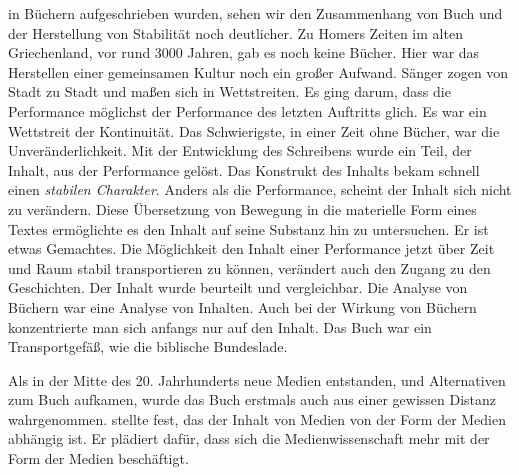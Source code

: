 in Büchern aufgeschrieben wurden, sehen wir den Zusammenhang von Buch und der
Herstellung von Stabilität noch deutlicher.   Zu Homers Zeiten im alten
Griechenland, vor rund 3000 Jahren, gab es noch keine Bücher. Hier war das
Herstellen einer gemeinsamen Kultur noch ein großer Aufwand. Sänger zogen von
Stadt zu Stadt und maßen sich in Wettstreiten. Es ging darum, dass die
Performance möglichst der Performance des letzten Auftritts glich. Es war ein
Wettstreit der Kontinuität. Das Schwierigste, in einer Zeit ohne Bücher, war die
Unveränderlichkeit. Mit der Entwicklung des Schreibens wurde ein Teil, der
Inhalt, aus der Performance gelöst. Das Konstrukt des Inhalts bekam schnell
einen \emph{stabilen Charakter}. Anders als die Performance, scheint der Inhalt
sich nicht zu verändern. Diese Übersetzung von Bewegung in die materielle Form
eines Textes ermöglichte es den Inhalt auf seine Substanz hin zu untersuchen. Er
ist etwas Gemachtes. Die Möglichkeit den Inhalt einer Performance jetzt über
Zeit und Raum stabil transportieren zu können, verändert auch den Zugang zu den
Geschichten. Der Inhalt wurde beurteilt und vergleichbar. Die Analyse von
Büchern war eine Analyse von Inhalten. Auch bei der Wirkung von Büchern
konzentrierte man sich anfangs nur auf den Inhalt. Das Buch war ein
Transportgefäß, wie die biblische Bundeslade.

  Als in der Mitte des 20. Jahrhunderts neue Medien entstanden, und Alternativen
  zum Buch aufkamen, wurde das Buch erstmals auch aus einer gewissen Distanz
  wahrgenommen.   stellte fest, das der Inhalt von
  Medien von der Form der Medien abhängig ist. Er plädiert dafür, dass sich die
  Medienwissenschaft mehr mit der Form der Medien beschäftigt.



